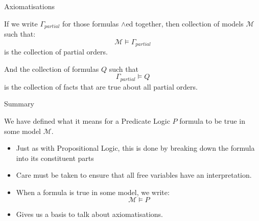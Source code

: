 \documentclass[xetex,aspectratio=169,14pt,hyperref={pdfpagelabels=true,pdflang={en-GB}}]{beamer}
\begin{document}
\begin{frame}
  {Axiomatisations}

  If we write $\Gamma_{\mathit{partial}}$ for those formulas $\land$ed
  together, then collection of models $\mathcal{M}$ such that:
  \begin{displaymath}
    \mathcal{M} \models \Gamma_{\mathit{partial}}
  \end{displaymath}
  is the collection of partial orders.

  \bigskip

  And the collection of formulas $Q$ such that
  \begin{displaymath}
    \Gamma_{\mathit{partial}} \models Q
  \end{displaymath}
  is the collection of facts that are true about all partial orders.
\end{frame}

\begin{frame}
  {Summary}

  We have defined what it means for a Predicate Logic $P$ formula to
  be true in some model $\mathcal{M}$.

  \begin{itemize}
  \item Just as with Propositional Logic, this is done by breaking
    down the formula into its constituent parts
  \item Care must be taken to ensure that all free variables have an
    interpretation.
  \item When a formula is true in some model, we write:
    \begin{displaymath}
      \mathcal{M} \models P
    \end{displaymath}
  \item Gives us a basis to talk about axiomatisations.
  \end{itemize}
\end{frame}




\end{document}
